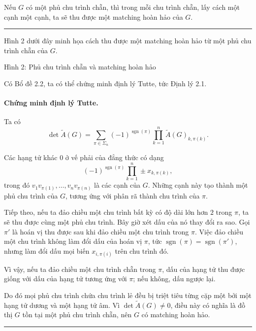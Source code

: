 \documentclass[11pt]{article}
\newcommand{\sgn}{\operatorname{sgn}}
\newcommand{\qedmark}{\hfill\rule{0.7ex}{0.7ex}}
\begin{document}
Nếu \(G\) có một phủ chu trình chẵn, thì trong mỗi chu trình chẵn, lấy cách
một cạnh một cạnh, ta sẽ thu được một matching hoàn hảo của \(G\). \qedmark

Hình 2 dưới đây minh họa cách thu được một matching hoàn hảo từ một phủ chu
trình chẵn của \(G\).

\begin{center}

\smallskip
Hình 2: Phủ chu trình chẵn và matching hoàn hảo
\end{center}

Có Bổ đề 2.2, ta có thể chứng minh định lý Tutte, tức Định lý 2.1.

\paragraph{Chứng minh định lý Tutte.}
Ta có
\[
  \det\tilde A(G)=
  \sum_{\pi\in\Sigma_n}(-1)^{\sgn(\pi)}
  \prod_{k=1}^{n}\tilde A(G)_{k,\pi(k)}.
  \tag{2.1}
\]

Các hạng tử khác \(0\) ở vế phải của đẳng thức có dạng
\[
  (-1)^{\sgn(\pi)}\prod_{k=1}^{n}\pm x_{k,\pi(k)},
\]
trong đó \(v_1v_{\pi(1)},\ldots,v_nv_{\pi(n)}\) là các cạnh của \(G\). Những
cạnh này tạo thành một phủ chu trình của \(G\), tương ứng với phân rã thành
chu trình của \(\pi\).

Tiếp theo, nếu ta đảo chiều một chu trình bất kỳ có độ dài lớn hơn \(2\) trong
\(\pi\), ta sẽ thu được cùng một phủ chu trình. Bây giờ xét dấu của nó thay đổi
ra sao. Gọi \(\pi'\) là hoán vị thu được sau khi đảo chiều một chu trình trong
\(\pi\). Việc đảo chiều một chu trình không làm đổi dấu của hoán vị \(\pi\),
tức \(\sgn(\pi)=\sgn(\pi')\), nhưng làm đổi dấu mọi biến \(x_{i,\pi(i)}\) trên
chu trình đó.

Vì vậy, nếu ta đảo chiều một chu trình chẵn trong \(\pi\), dấu của hạng tử thu
được giống với dấu của hạng tử tương ứng với \(\pi\); nếu không, dấu ngược
lại.

Do đó mọi phủ chu trình chứa chu trình lẻ đều bị triệt tiêu từng cặp một bởi
một hạng tử dương và một hạng tử âm. Vì \(\det\tilde A(G)\ne 0\), điều này có
nghĩa là đồ thị \(G\) tồn tại một phủ chu trình chẵn, nên \(G\) có matching
hoàn hảo. \qedmark
\end{document}
